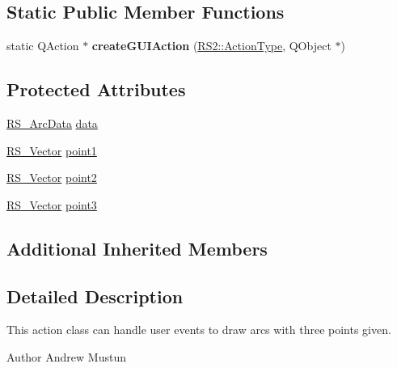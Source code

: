 \subsection*{Static Public Member Functions}
\begin{DoxyCompactItemize}
\item 
\hypertarget{classRS__ActionDrawArc3P_a9b2e95e3ac26fb13c0949c933f2f5457}{static Q\-Action $\ast$ {\bfseries create\-G\-U\-I\-Action} (\hyperlink{classRS2_afe3523e0bc41fd637b892321cfc4b9d7}{R\-S2\-::\-Action\-Type}, Q\-Object $\ast$)}\label{classRS__ActionDrawArc3P_a9b2e95e3ac26fb13c0949c933f2f5457}

\end{DoxyCompactItemize}
\subsection*{Protected Attributes}
\begin{DoxyCompactItemize}
\item 
\hyperlink{classRS__ArcData}{R\-S\-\_\-\-Arc\-Data} \hyperlink{classRS__ActionDrawArc3P_a56fdac87099d7dc36c415259a3abfc6f}{data}
\item 
\hyperlink{classRS__Vector}{R\-S\-\_\-\-Vector} \hyperlink{classRS__ActionDrawArc3P_a27089018ee7feb634c14dc1fa244ef9b}{point1}
\item 
\hyperlink{classRS__Vector}{R\-S\-\_\-\-Vector} \hyperlink{classRS__ActionDrawArc3P_ac7152c096710a554ca2979634f9de54f}{point2}
\item 
\hyperlink{classRS__Vector}{R\-S\-\_\-\-Vector} \hyperlink{classRS__ActionDrawArc3P_a60d7c64707814a9eceb03e674da08fcd}{point3}
\end{DoxyCompactItemize}
\subsection*{Additional Inherited Members}


\subsection{Detailed Description}
This action class can handle user events to draw arcs with three points given.

\begin{DoxyAuthor}{Author}
Andrew Mustun 
\end{DoxyAuthor}


